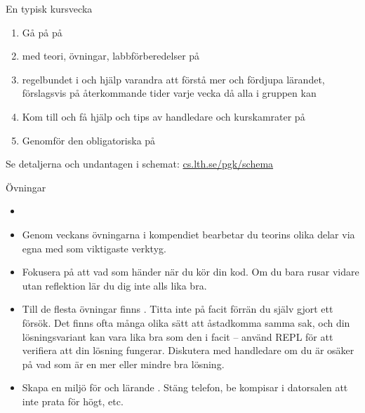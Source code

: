 \fi %

\begin{Slide}{En typisk kursvecka}
\begin{enumerate}
\item Gå på  på 
\item {}  med teori, övningar, labbförberedelser på  
\item {} regelbundet i  och hjälp varandra att förstå mer och fördjupa lärandet, förslagsvis på återkommande tider varje vecka då alla i gruppen kan
\item Kom till  och få hjälp och tips av handledare och kurskamrater på 
\item Genomför den obligatoriska  på 
\end{enumerate}
Se detaljerna och undantagen i schemat: \href{http://cs.lth.se/pgk/schema}{cs.lth.se/pgk/schema}
\end{Slide}

\ifkompendium\else  %
\begin{SlideExtra}{Övningar}\SlideFontSmall
\begin{itemize}
  \item {}

\item Genom veckans övningarna i kompendiet bearbetar du teorins olika delar via egna  med  som viktigaste verktyg.

\item Fokusera på att  vad som händer när du kör din kod. Om du bara rusar vidare utan reflektion lär du dig inte alls lika bra.

\item Till de flesta övningar finns . Titta inte på facit förrän du själv gjort ett försök. Det finns ofta många olika sätt att åstadkomma samma sak, och din lösningsvariant kan vara lika bra som den i facit -- använd REPL för att verifiera att din lösning fungerar. Diskutera med handledare om du är osäker på vad som är en mer eller mindre bra lösning.

\item Skapa en miljö för  och lärande . Stäng telefon, be kompisar i datorsalen att inte prata för högt, etc.
\end{itemize}
\end{SlideExtra}

